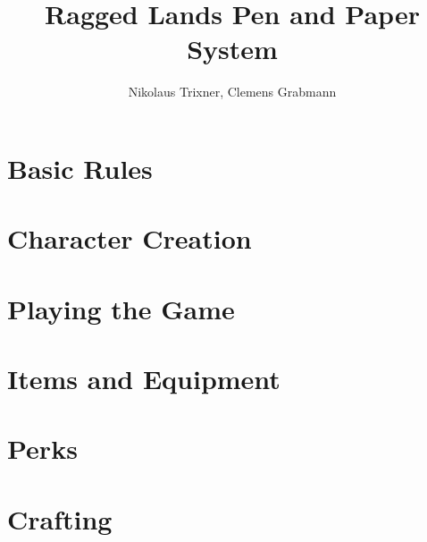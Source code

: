 \documentclass{report}
\begin{document}
	\title{Ragged Lands Pen and Paper System}
	\author{Nikolaus Trixner, Clemens Grabmann}
		
	\maketitle
	
	\tableofcontents

%	
%	

\part{Basic Rules}
	
\newpage

\part{Character Creation}
	
	
	
%	
%	
\newpage

\part{Playing the Game}
	
	
	
	
\newpage

\part{Items and Equipment}
	
	
	
\newpage

\part{Perks}
	
	
	
	
	
	
	
\newpage

\part{Crafting}
	
	\newpage
	
\end{document}
